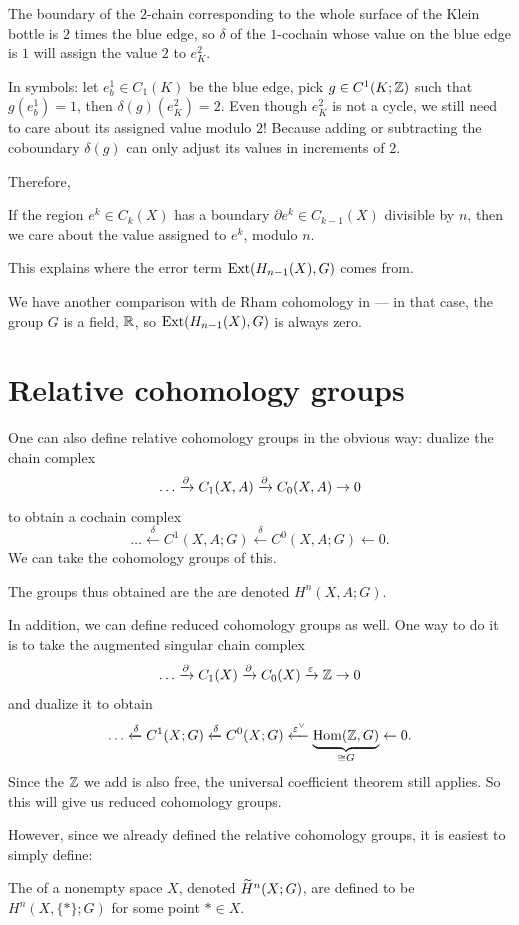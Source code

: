 The boundary of the $2$-chain corresponding to the whole surface of the Klein bottle is $2$ times
the blue edge, so $\delta$ of the $1$-cochain whose value on the blue edge is $1$
will assign the value $2$ to $e^2_K$.

In symbols: let $e^1_b \in C_1(K)$ be the blue edge, pick $g \in C^1(K; \mathbb Z)$ such that
$g(e^1_b) = 1$, then $\delta(g)(e^2_K) = 2$.
Even though $e^2_K$ is not a cycle, we still need to care about its assigned value modulo $2$!
Because adding or subtracting the coboundary $\delta(g)$ can only adjust its values in increments
of $2$.

Therefore,
\begin{moral}
	If the region $e^k \in C_k(X)$ has a boundary $\partial e^k \in C_{k-1}(X)$ divisible by $n$,
	then we care about the value assigned to $e^k$, modulo $n$.
\end{moral}

This explains where the error term $\operatorname{Ext}(H_{n-1}(X), G)$ comes from.

We have another comparison with de Rham cohomology in  ---
in that case, the group $G$ is a field, $\mathbb R$, so $\operatorname{Ext}(H_{n-1}(X), G)$ is always zero.

\section{Relative cohomology groups}
One can also define relative cohomology groups in the obvious way:
dualize the chain complex
\[ \dots \xrightarrow{\partial} C_1(X,A) \xrightarrow{\partial} C_0(X,A) \to 0 \]
to obtain a cochain complex
\[
	\dots \xleftarrow\delta C^1(X,A;G) \xleftarrow\delta C^0(X,A;G)
	\leftarrow 0.
\]
We can take the cohomology groups of this.
\begin{definition}
	The groups thus obtained are the 
	are denoted $H^n(X,A;G)$.
\end{definition}

In addition, we can define reduced cohomology groups as well.
One way to do it is to take the augmented singular chain complex
\[ \dots \xrightarrow{\partial} C_1(X) \xrightarrow{\partial} C_0(X) \xrightarrow{\varepsilon} \mathbb Z \to 0 \]
and dualize it to obtain
\[
	\dots \xleftarrow\delta C^1(X;G) \xleftarrow\delta C^0(X;G)
	\xleftarrow{\varepsilon^\vee} \underbrace{\operatorname{Hom}(\mathbb Z, G)}_{\cong G}
	\leftarrow 0.
\]
Since the $\mathbb Z$ we add is also free,
the universal coefficient theorem still applies.
So this will give us reduced cohomology groups.

However, since we already defined the relative cohomology groups,
it is easiest to simply define:
\begin{definition}
	The  of a nonempty space $X$,
	denoted $\widetilde H^n(X; G)$,
	are defined to be $H^n(X, \{\ast\} ; G)$
	for some point $\ast \in X$.
\end{definition}


